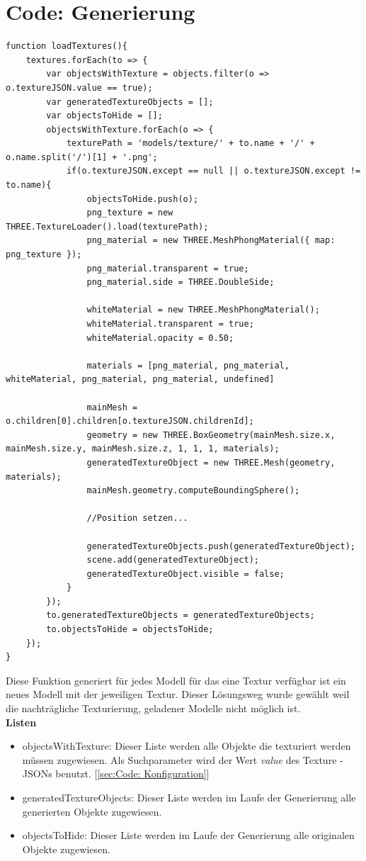 \section{Code: Generierung}
\begin{lstlisting}
function loadTextures(){
    textures.forEach(to => {
        var objectsWithTexture = objects.filter(o => o.textureJSON.value == true);
        var generatedTextureObjects = [];
        var objectsToHide = [];
        objectsWithTexture.forEach(o => {
            texturePath = 'models/texture/' + to.name + '/' + o.name.split('/')[1] + '.png';
            if(o.textureJSON.except == null || o.textureJSON.except != to.name){
                objectsToHide.push(o);
                png_texture = new THREE.TextureLoader().load(texturePath);
                png_material = new THREE.MeshPhongMaterial({ map: png_texture });
                png_material.transparent = true;
                png_material.side = THREE.DoubleSide;

                whiteMaterial = new THREE.MeshPhongMaterial();
                whiteMaterial.transparent = true;
                whiteMaterial.opacity = 0.50;

                materials = [png_material, png_material, whiteMaterial, png_material, png_material, undefined]

                mainMesh = o.children[0].children[o.textureJSON.childrenId];
                geometry = new THREE.BoxGeometry(mainMesh.size.x, mainMesh.size.y, mainMesh.size.z, 1, 1, 1, materials);
                generatedTextureObject = new THREE.Mesh(geometry, materials);
                mainMesh.geometry.computeBoundingSphere();

                //Position setzen...

                generatedTextureObjects.push(generatedTextureObject);
                scene.add(generatedTextureObject);
                generatedTextureObject.visible = false;
            }
        });
        to.generatedTextureObjects = generatedTextureObjects;
        to.objectsToHide = objectsToHide;
    });
}
\end{lstlisting}
Diese Funktion generiert für jedes Modell für das eine Textur verfügbar ist ein neues Modell mit der jeweiligen Textur. Dieser Lösungsweg wurde gewählt weil die nachträgliche Texturierung, geladener Modelle nicht möglich ist. \\
\textbf{Listen}
\begin{itemize}
    \item objectsWithTexture: Dieser Liste werden alle Objekte die texturiert werden müssen zugewiesen. Als Suchparameter wird der Wert \textit{value} des Texture - JSONs benutzt. [\ref{sec:Code: Konfiguration}]
    \item generatedTextureObjects: Dieser Liste werden im Laufe der Generierung alle generierten Objekte zugewiesen.
    \item objectsToHide: Dieser Liste werden im Laufe der Generierung alle originalen Objekte zugewiesen.
\end{itemize}
